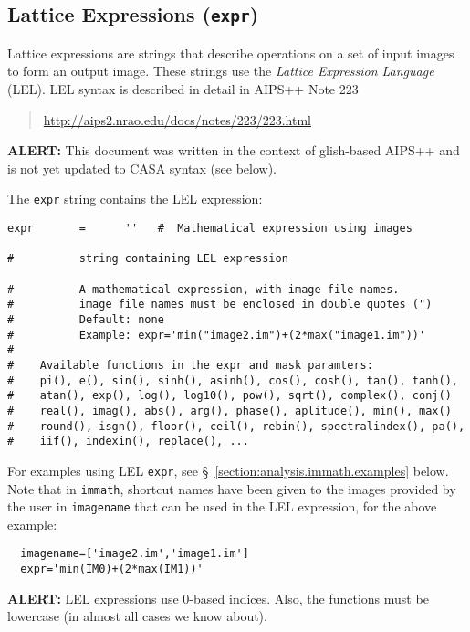 \subsection{Lattice Expressions ({\tt expr})}
\label{section:analysis.pars.lattice}

Lattice expressions are strings that describe operations on a
set of input images to form an output image.  These strings
use the {\em Lattice Expression Language} (LEL).  LEL syntax
is described in detail in AIPS++ Note 223 
\begin{quote}
   \url{http://aips2.nrao.edu/docs/notes/223/223.html}
\end{quote}
{\bf ALERT:} This document was written in the context of
glish-based AIPS++ and is not yet updated to CASA syntax 
(see below).

The {\tt expr} string contains the LEL expression:
\small
\begin{verbatim}
expr       =      ''   #  Mathematical expression using images

#          string containing LEL expression

#          A mathematical expression, with image file names.
#          image file names must be enclosed in double quotes (")
#          Default: none 
#          Example: expr='min("image2.im")+(2*max("image1.im"))'
#
#    Available functions in the expr and mask paramters:
#    pi(), e(), sin(), sinh(), asinh(), cos(), cosh(), tan(), tanh(),
#    atan(), exp(), log(), log10(), pow(), sqrt(), complex(), conj()
#    real(), imag(), abs(), arg(), phase(), aplitude(), min(), max()
#    round(), isgn(), floor(), ceil(), rebin(), spectralindex(), pa(), 
#    iif(), indexin(), replace(), ...
\end{verbatim}
\normalsize

For examples using LEL {\tt expr}, see 
\S~\ref{section:analysis.immath.examples} below.  Note that in
{\tt immath}, shortcut names have been given to the images provided
by the user in {\tt imagename} that can be used in the LEL expression,
for the above example:
\small
\begin{verbatim}
  imagename=['image2.im','image1.im']
  expr='min(IM0)+(2*max(IM1))'
\end{verbatim}
\normalsize


{\bf ALERT:} LEL expressions use 0-based indices.
Also, the functions must be lowercase (in almost all cases we know
about).
    
